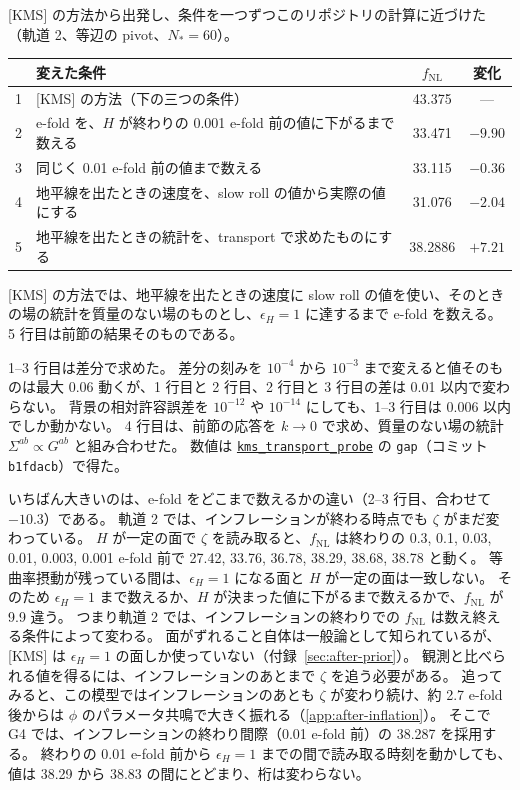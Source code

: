 \documentclass[a4paper,11pt]{ltjsarticle}
\newcommand{\fnl}{f_{\mathrm{NL}}}
\newcommand{\code}[1]{\texttt{#1}}
\newcommand{\repourl}{https://github.com/inuverse44/phys-type-dev}
\begin{document}
[KMS] の方法から出発し、条件を一つずつこのリポジトリの計算に近づけた（軌道 2、等辺の pivot、$N_*=60$）。
\begin{center}
\begin{tabular}{clcc}
\toprule
 & 変えた条件 & $\fnl$ & 変化 \\
\midrule
1 & [KMS] の方法（下の三つの条件） & 43.375 & --- \\
2 & e-fold を、$H$ が終わりの 0.001 e-fold 前の値に下がるまで数える & 33.471 & $-9.90$ \\
3 & 同じく 0.01 e-fold 前の値まで数える & 33.115 & $-0.36$ \\
4 & 地平線を出たときの速度を、slow roll の値から実際の値にする & 31.076 & $-2.04$ \\
5 & 地平線を出たときの統計を、transport で求めたものにする & 38.2886 & $+7.21$ \\
\bottomrule
\end{tabular}
\end{center}
[KMS] の方法では、地平線を出たときの速度に slow roll の値を使い、そのときの場の統計を質量のない場のものとし、$\epsilon_H=1$ に達するまで e-fold を数える。
5 行目は前節の結果そのものである。

1--3 行目は差分で求めた。
差分の刻みを $10^{-4}$ から $10^{-3}$ まで変えると値そのものは最大 0.06 動くが、1 行目と 2 行目、2 行目と 3 行目の差は 0.01 以内で変わらない。
背景の相対許容誤差を $10^{-12}$ や $10^{-14}$ にしても、1--3 行目は 0.006 以内でしか動かない。
4 行目は、前節の応答を $k\to0$ で求め、質量のない場の統計 $\Sigma^{ab}\propto G^{ab}$ と組み合わせた。
数値は \href{\repourl/blob/b1fdacb/crates/phys-type-models/examples/kms_transport_probe.rs}{\texttt{kms\_transport\_probe}} の \code{gap}（コミット \code{b1fdacb}）で得た。

いちばん大きいのは、e-fold をどこまで数えるかの違い（2--3 行目、合わせて $-10.3$）である。
軌道 2 では、インフレーションが終わる時点でも $\zeta$ がまだ変わっている。
$H$ が一定の面で $\zeta$ を読み取ると、$\fnl$ は終わりの 0.3, 0.1, 0.03, 0.01, 0.003, 0.001 e-fold 前で 27.42, 33.76, 36.78, 38.29, 38.68, 38.78 と動く。
等曲率摂動が残っている間は、$\epsilon_H=1$ になる面と $H$ が一定の面は一致しない。
そのため $\epsilon_H=1$ まで数えるか、$H$ が決まった値に下がるまで数えるかで、$\fnl$ が 9.9 違う。
つまり軌道 2 では、インフレーションの終わりでの $\fnl$ は数え終える条件によって変わる。
面がずれること自体は一般論として知られている\cite{Lyth2005}が、[KMS] は $\epsilon_H=1$ の面しか使っていない（付録~\ref{sec:after-prior}）。
観測と比べられる値を得るには、インフレーションのあとまで $\zeta$ を追う必要がある。
追ってみると、この模型ではインフレーションのあとも $\zeta$ が変わり続け、約 2.7 e-fold 後からは $\phi$ のパラメータ共鳴で大きく振れる（\ref{app:after-inflation}）。
そこで G4 では、インフレーションの終わり間際（0.01 e-fold 前）の 38.287 を採用する。
終わりの 0.01 e-fold 前から $\epsilon_H=1$ までの間で読み取る時刻を動かしても、値は 38.29 から 38.83 の間にとどまり、桁は変わらない。
\end{document}
